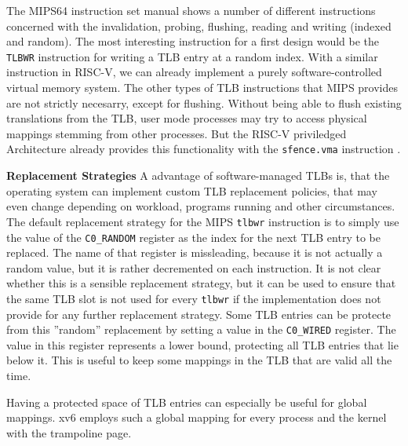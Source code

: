 
The MIPS64 instruction set manual \cite{MIPSArchitectureProgrammers2016}
shows a number of different instructions concerned with the invalidation, probing, flushing, reading
and writing (indexed and random).
The most interesting instruction for a first design would be the \texttt{TLBWR} instruction for writing a TLB
entry at a random index. With a similar instruction in RISC-V, we can already implement a purely
software-controlled virtual memory system.
The other types of TLB instructions that MIPS provides are not strictly necesarry,
except for flushing. Without being able to flush existing translations from the TLB,
user mode processes may try to access physical mappings stemming from other processes.
But the RISC-V priviledged Architecture already provides this functionality
with the \texttt{sfence.vma} instruction \cite{riscvreader}.


\textbf{Replacement Strategies} A advantage of software-managed TLBs is, that the operating system can implement custom
TLB replacement policies, that may even change depending on workload, programs running
and other circumstances.
The default replacement strategy for the MIPS \texttt{tlbwr} instruction is to simply
use the value of the \texttt{C0\_RANDOM} register as the index for the next TLB entry
to be replaced. The name of that register is missleading, because it is not actually a
random value, but it is rather decremented on each instruction\cite{heiserAnatomyHighPerformanceMicrokernel}.
It is not clear whether this is a sensible replacement strategy,
but it can be used to ensure that the same TLB slot is not used for every \texttt{tlbwr} if the implementation
does not provide for any further replacement strategy.
Some TLB entries can be protecte from this ''random'' replacement by setting a value in the \texttt{C0\_WIRED}
register. The value in this register represents a lower bound, protecting all TLB entries that lie below it.
This is useful to keep some mappings in the TLB that are valid all the time.

Having a protected space of TLB entries can especially be useful for global mappings. xv6 employs such a global
mapping for every process and the kernel with the trampoline page.

